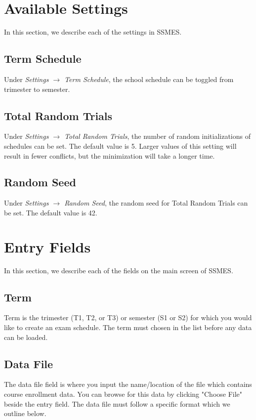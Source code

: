 \documentclass[12pt]{article}
\begin{document}
\section{Available Settings}
In this section, we describe each of the settings in SSMES.

\subsection{Term Schedule}
Under \textit{Settings $\to$ Term Schedule}, the school schedule can be toggled from trimester to semester.
\subsection{Total Random Trials}
Under \textit{Settings $\to$ Total Random Trials}, the number of random initializations of schedules can be set. The default value is 5. Larger values of this setting will result in fewer conflicts, but the minimization will take a longer time.
\subsection{Random Seed}
Under \textit{Settings $\to$ Random Seed}, the random seed for Total Random Trials can be set. The default value is 42.

\section{Entry Fields}
In this section, we describe each of the fields on the main screen of SSMES.

\subsection{Term}
Term is the trimester (T1, T2, or T3) or semester (S1 or S2) for which you would like to create an exam schedule. The term must chosen in the list before any data can be loaded.
\subsection{Data File}
The data file field is where you input the name/location of the file which contains course enrollment data. You can browse for this data by clicking "Choose File" beside the entry field. The data file must follow a specific format which we outline below.
\end{document}
